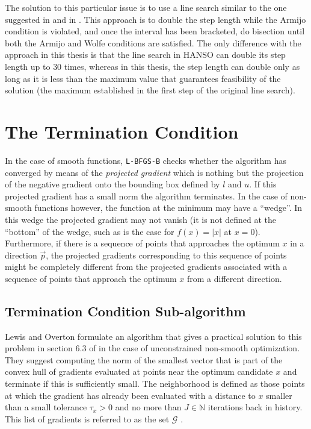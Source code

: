 The solution to this particular issue is to use a line search similar to the one suggested in\citep{overtonlewis} and in \citep{hanso}. This approach is to double the step length while the Armijo condition is violated, and once the interval has been bracketed, do bisection until both the Armijo and Wolfe conditions are satisfied. The only difference with the approach in this thesis is that the line search in HANSO can double its step length up to $30$ times, whereas in this thesis, the step length can double only as long as it is less than the maximum value that guarantees feasibility of the solution (the maximum established in the first step of the original line search).

\section{The Termination Condition} \label{terminator}

In the case of smooth functions, \texttt{L-BFGS-B} checks whether the algorithm has converged by means of the \emph{projected gradient} which is nothing but the projection of the negative gradient onto the bounding box defined by $l$ and $u$. If this projected gradient has a small norm the algorithm terminates. In the case of non-smooth functions however, the function at the minimum may have a ``wedge''. In this wedge the projected gradient may not vanish (it is not defined at the ``bottom'' of the wedge, such as is the case for $f(x) = |x|$ at $x = 0$). Furthermore, if there is a sequence of points that approaches the optimum $x$ in a direction $\vec{p}$, the projected gradients corresponding to this sequence of points might be completely different from the projected gradients associated with a sequence of points that approach the optimum $x$ from a different direction.

\subsection{Termination Condition Sub-algorithm}
Lewis and Overton formulate an algorithm that gives a practical solution to this problem in section $6.3$ of \citep{overtonlewis}
in the case of unconstrained non-smooth optimization. They suggest computing the norm of the smallest vector that is part of the convex hull of gradients evaluated at points near the optimum candidate $x$ and terminate if this is sufficiently small. The neighborhood is defined as those points at which the gradient has already been evaluated with a distance to $x$ smaller than a small tolerance $\tau_x > 0$ and no more than $J \in \mathbb{N}$ iterations back in history. This list of gradients is referred to as the set $\mathcal{G}$ \citep{overtonlewis}.

